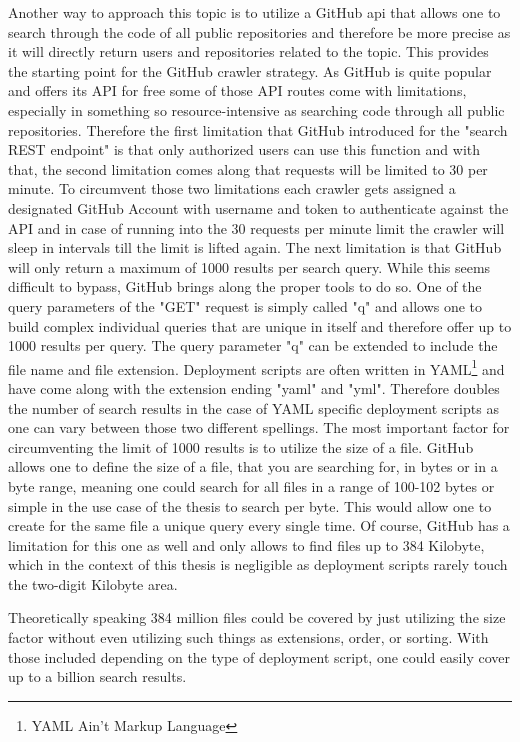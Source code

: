 Another way to approach this topic is to utilize a GitHub api that allows one to search through the code of all public repositories and therefore be more precise as it will directly return users and repositories related to the topic. This provides the starting point for the GitHub crawler strategy. As GitHub is quite popular and offers its API for free some of those API routes come with limitations, especially in something so resource-intensive as searching code through all public repositories.
Therefore the first limitation that GitHub introduced for the "search REST endpoint" is that only authorized users can use this function and with that, the second limitation comes along that requests will be limited to 30 per minute. To circumvent those two limitations each crawler gets assigned a designated GitHub Account with username and token to authenticate against the API and in case of running into the 30 requests per minute limit the crawler will sleep in intervals till the limit is lifted again.
The next limitation is that GitHub will only return a maximum of 1000 results per search query. While this seems difficult to bypass, GitHub brings along the proper tools to do so. One of the query parameters of the "GET" request is simply called "q" and allows one to build complex individual queries that are unique in itself and therefore offer up to 1000 results per query. The query parameter "q" can be extended to include the file name and file extension. Deployment scripts are often written in YAML\footnote{YAML Ain't Markup Language} and have come along with the extension ending "yaml" and "yml". Therefore doubles the number of search results in the case of YAML specific deployment scripts as one can vary between those two different spellings. The most important factor for circumventing the limit of 1000 results is to utilize the size of a file. GitHub allows one to define the size of a file, that you are searching for, in bytes or in a byte range, meaning one could search for all files in a range of 100-102 bytes or simple in the use case of the thesis to search per byte. This would allow one to create for the same file a unique query every single time.
Of course, GitHub has a limitation for this one as well and only allows to find files up to 384 Kilobyte, which in the context of this thesis is negligible as deployment scripts rarely touch the two-digit Kilobyte area.

Theoretically speaking 384 million files could be covered by just utilizing the size factor without even utilizing such things as extensions, order, or sorting. With those included depending on the type of deployment script, one could easily cover up to a billion search results.

